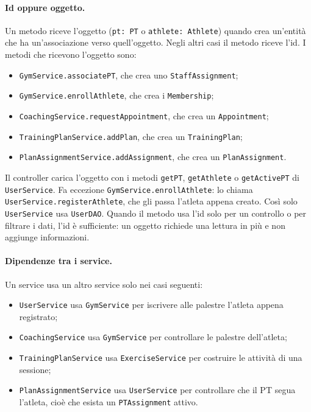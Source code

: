 \paragraph{Id oppure oggetto.} Un metodo riceve l'oggetto
(\texttt{pt: PT} o \texttt{athlete: Athlete}) quando crea un'entità
che ha un'associazione verso quell'oggetto. Negli altri casi il
metodo riceve l'id. I metodi che ricevono l'oggetto sono:
\begin{itemize}
  \item \texttt{GymService.associatePT}, che crea uno
    \texttt{StaffAssignment};
  \item \texttt{GymService.enrollAthlete}, che crea i
    \texttt{Membership};
  \item \texttt{CoachingService.requestAppointment}, che crea un
    \texttt{Appointment};
  \item \texttt{TrainingPlanService.addPlan}, che crea un
    \texttt{TrainingPlan};
  \item \texttt{PlanAssignmentService.addAssignment}, che crea un
    \texttt{PlanAssignment}.
\end{itemize}
Il controller carica l'oggetto con i metodi \texttt{getPT},
\texttt{getAthlete} o \texttt{getActivePT} di \texttt{UserService}.
Fa eccezione \texttt{GymService.enrollAthlete}: lo chiama
\texttt{UserService.registerAthlete}, che gli passa l'atleta appena
creato. Così solo \texttt{UserService} usa \texttt{UserDAO}. Quando il metodo
usa l'id solo per un controllo o per filtrare i dati, l'id è
sufficiente: un oggetto richiede una lettura in più e non aggiunge
informazioni.

\paragraph{Dipendenze tra i service.} Un service usa un altro service
solo nei casi seguenti:
\begin{itemize}
  \item \texttt{UserService} usa \texttt{GymService} per iscrivere
    alle palestre l'atleta appena registrato;
  \item \texttt{CoachingService} usa \texttt{GymService} per
    controllare le palestre dell'atleta;
  \item \texttt{TrainingPlanService} usa \texttt{ExerciseService} per
    costruire le attività di una sessione;
  \item \texttt{PlanAssignmentService} usa \texttt{UserService} per
    controllare che il PT segua l'atleta, cioè che esista un
    \texttt{PTAssignment} attivo.
\end{itemize}

